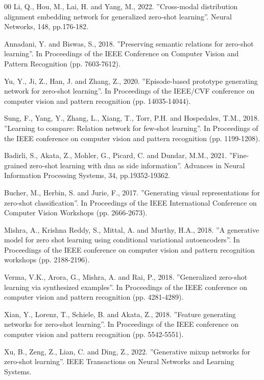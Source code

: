 \documentclass{article}
\begin{document}
\begin{thebibliography}{00}
 Li, Q., Hou, M., Lai, H. and Yang, M., 2022. ''Cross-modal distribution alignment embedding network for generalized zero-shot learning''. Neural Networks, 148, pp.176-182.

 Annadani, Y. and Biswas, S., 2018. ''Preserving semantic relations for zero-shot learning''. In Proceedings of the IEEE Conference on Computer Vision and Pattern Recognition (pp. 7603-7612).

 Yu, Y., Ji, Z., Han, J. and Zhang, Z., 2020. ''Episode-based prototype generating network for zero-shot learning''. In Proceedings of the IEEE/CVF conference on computer vision and pattern recognition (pp. 14035-14044).

 Sung, F., Yang, Y., Zhang, L., Xiang, T., Torr, P.H. and Hospedales, T.M., 2018. ''Learning to compare: Relation network for few-shot learning''. In Proceedings of the IEEE conference on computer vision and pattern recognition (pp. 1199-1208).

 Badirli, S., Akata, Z., Mohler, G., Picard, C. and Dundar, M.M., 2021. ''Fine-grained zero-shot learning with dna as side information''. Advances in Neural Information Processing Systems, 34, pp.19352-19362.

 Bucher, M., Herbin, S. and Jurie, F., 2017. ''Generating visual representations for zero-shot classification''. In Proceedings of the IEEE International Conference on Computer Vision Workshops (pp. 2666-2673).

 Mishra, A., Krishna Reddy, S., Mittal, A. and Murthy, H.A., 2018. ''A generative model for zero shot learning using conditional variational autoencoders''. In Proceedings of the IEEE conference on computer vision and pattern recognition workshops (pp. 2188-2196).

 Verma, V.K., Arora, G., Mishra, A. and Rai, P., 2018. ''Generalized zero-shot learning via synthesized examples''. In Proceedings of the IEEE conference on computer vision and pattern recognition (pp. 4281-4289).

 Xian, Y., Lorenz, T., Schiele, B. and Akata, Z., 2018. ''Feature generating networks for zero-shot learning''. In Proceedings of the IEEE conference on computer vision and pattern recognition (pp. 5542-5551).

 Xu, B., Zeng, Z., Lian, C. and Ding, Z., 2022. ''Generative mixup networks for zero-shot learning''. IEEE Transactions on Neural Networks and Learning Systems.


\end{thebibliography}
\end{document}
